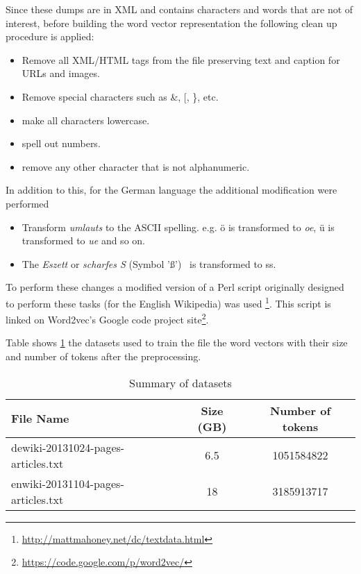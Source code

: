Since these dumps are in XML and contains characters and words that are not of
interest, before building the word vector representation the following clean up
procedure is applied:

\begin{itemize}
\item Remove all XML/HTML tags from the file preserving text and caption for
 URLs and images.
\item Remove special characters such as \&,  [, \}, etc.
\item make all characters lowercase.
\item spell out numbers.
\item remove any other character that is not alphanumeric.
\end{itemize}

In addition to this, for the German language the additional modification were
performed
\begin{itemize}
\item Transform \textit{umlauts} to the ASCII spelling.  e.g. \"{o} is
  transformed to \textit{oe},  \"{u} is transformed to \textit{ue}  and so
  on. 
\item The \textit{Eszett} or \textit{scharfes S} (Symbol '\ss') \  is transformed to ss.
\end{itemize}


To perform these changes a modified version of a Perl script originally
designed to perform these tasks (for the English Wikipedia) was used
\footnote{\url{http://mattmahoney.net/dc/textdata.html}}. This script is
linked on Word2vec's Google code project site\footnote{\url{https://code.google.com/p/word2vec/}}.

Table shows \ref{tab:summ_dataset_germanword2vec} the datasets used
to train the file the word vectors with their size and number of tokens after
the preprocessing. 
  

 \begin{table}[h]

   \centering
   
   \caption{Summary of datasets} 
   \label{tab:summ_dataset_germanword2vec}
   \small
   \begin{tabular}{ |l|c|c| }
   \hline           
    File Name &  Size (GB) & Number of tokens  \\  \hline           
    dewiki-20131024-pages-articles.txt & 6.5 &   1051584822 \\ 
    enwiki-20131104-pages-articles.txt & 18 &  3185913717  \\
    \hline

\end{tabular}
\end{table}

